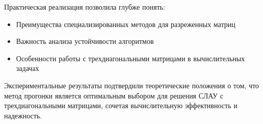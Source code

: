 Практическая реализация позволила глубже понять:
\begin{itemize}
\item Преимущества специализированных методов для разреженных матриц
\item Важность анализа устойчивости алгоритмов
\item Особенности работы с трехдиагональными матрицами в вычислительных задачах
\end{itemize}

Экспериментальные результаты подтвердили теоретические положения о том, 
что метод прогонки является оптимальным выбором для решения СЛАУ с трехдиагональными матрицами, 
сочетая вычислительную эффективность и надежность.

\pagebreak
